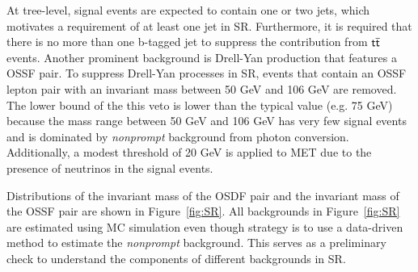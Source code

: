 At tree-level, signal events are expected to contain one or two jets, which motivates a requirement of at least one jet in \ac{SR}. Furthermore, it is required that there is no more than one b-tagged jet to suppress the contribution from $\textsf{t}\overline{\textsf{t}}$ events. Another prominent background is Drell-Yan production that features a \ac{OSSF} pair. To suppress Drell-Yan processes in \ac{SR}, events that contain an \ac{OSSF} lepton pair with an invariant mass between 50 GeV and 106 GeV are removed. The lower bound of the this veto is lower than the typical value (e.g. 75 GeV) because the mass range between 50 GeV and 106 GeV has very few signal events and is dominated by \emph{nonprompt} background from photon conversion. Additionally, a modest threshold of 20 GeV is applied to \ac{MET} due to the presence of neutrinos in the signal events.

Distributions of the invariant mass of the \ac{OSDF} pair and the invariant mass of the \ac{OSSF} pair are shown in Figure~\ref{fig:SR}. All backgrounds in Figure~\ref{fig:SR} are estimated using MC simulation even though strategy is to use a data-driven method to estimate the \emph{nonprompt} background. This serves as a preliminary check to understand the components of different backgrounds in \ac{SR}. 

